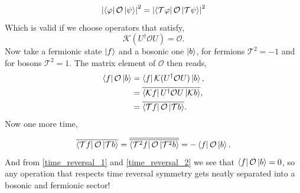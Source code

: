 \begin{equation*}
    \abs{\bra{\varphi}\mathcal{O}\ket{\psi}}^2
    =
    \abs{\bra{\mathcal{T}\varphi}\mathcal{O}\ket{\mathcal{T}\psi}}^2
\end{equation*}
Which is valid if we choose operators that satisfy,
\begin{equation*}
    \mathcal{K}(U^\dagger\mathcal{O}U) = \mathcal{O}.
\end{equation*}
Now take a fermionic state  $\ket{f}$ and a bosonic one $\ket{b}$,
for fermions $\mathcal{T}^2=-1$ and for bosons $\mathcal{T}^2=1$. The matrix
element of $\mathcal{O}$ then reads,
\begin{align}
    \begin{split}
    \bra{f}\mathcal{O}\ket{b}&
    =\bra{f}\mathcal{K}(U^\dagger\mathcal{O}U)\ket{b},\\
    &=\overline{\bra{\mathcal{K}f}U^\dagger\mathcal{O}U\ket{\mathcal{K}b}},\\
    &=\overline{\bra{\mathcal{T}f}\mathcal{O}\ket{\mathcal{T}b}}.
    \label{time_reversal_1}
    \end{split}
\end{align}
Now one more time,

\begin{equation}
    \overline{\bra{\mathcal{T}f}\mathcal{O}\ket{\mathcal{T}b}}
    =
    \overline{\overline{\bra{\mathcal{T}^2f}\mathcal{O}\ket{\mathcal{T}^2b}}}
    =-\bra{f}\mathcal{O}\ket{b}.
    \label{time_reversal_2}
\end{equation}
And from \ref{time_reversal_1} and \ref{time_reversal_2} we see that 
 $\bra{f}\mathcal{O}\ket{b}=0$, so any operation that respects time reversal 
 symmetry gets neatly separated into a bosonic and fermionic sector!
